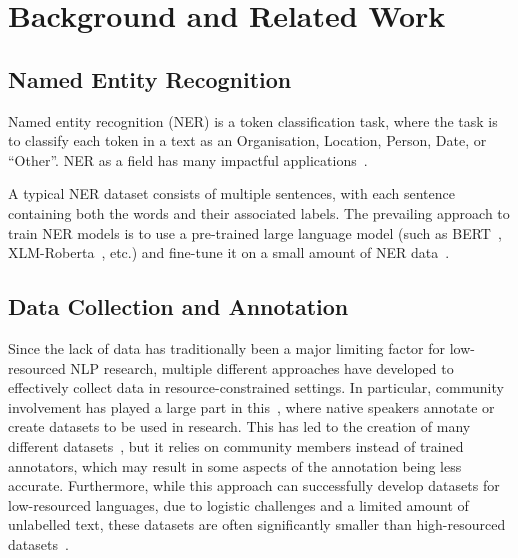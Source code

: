 \documentclass{article}
\newcommand{\mike}[1]{\textcolor{red}{#1}}
\begin{document}

\section{Background and Related Work}
\subsection{Named Entity Recognition}
Named entity recognition (NER) is a token classification task, where the task is to classify each token in a text as an Organisation, Location, Person, Date, or ``Other''. NER as a field has many impactful applications~\citep{sang2003introduction_conll,lample2016Playing}.

A typical NER dataset consists of multiple sentences, with each sentence containing both the words and their associated labels.
The prevailing approach to train NER models is to use a pre-trained large language model (such as BERT~\citep{devlin2019BERT}, XLM-Roberta~\citep{conneau2019Unsupervised}, etc.) and fine-tune it on a small amount of NER data~\citep{conneau2019Unsupervised,adelani2021MasakhaNER}.

\subsection{Data Collection and Annotation}
Since the lack of data has traditionally been a major limiting factor for low-resourced NLP research, multiple different approaches have developed to effectively collect data in resource-constrained settings. In particular, community involvement has played a large part in this~\citep{nekoto2020Participatory,nekoto2022Participatory}, where native speakers annotate or create datasets to be used in research. This has led to the creation of many different datasets~\citep{adelani2021MasakhaNER,nekoto2022Participatory}, but it relies on community members instead of trained annotators, which may result in some aspects of the annotation being less accurate. Furthermore, while this approach can successfully develop datasets for low-resourced languages, due to logistic challenges and a limited amount of unlabelled text, these datasets are often significantly smaller than high-resourced datasets~\citep{conneau2019Unsupervised,adelani2021MasakhaNER}.
\end{document}
